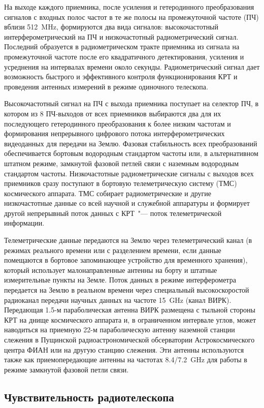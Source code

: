 На выходе каждого приемника, после усиления и гетеродинного преобразования сигналов с входных полос
частот в те же полосы на промежуточной частоте (ПЧ) вблизи \SI{512}{\MHz}, формируются два вида
сигналов: высокочастотный интерферометрический на ПЧ и низкочастотный радиометрический сигнал.
Последний образуется в радиометрическом тракте приемника из сигнала на промежуточной частоте после
его квадратичного детектирования, усиления и усреднения на интервалах времени около секунды.
Радиометрический сигнал дает возможность быстрого и эффективного контроля функционирования КРТ и
проведения антенных измерений в режиме одиночного телескопа.

Высокочастотный сигнал на ПЧ с выхода приемника поступает на селектор ПЧ, в котором из 8 ПЧ-выходов
от всех приемников выбираются два для их последующего гетеродинного преобразования к более низким
частотам и формирования непрерывного цифрового потока интерферометрических видеоданных для передачи
на Землю. Фазовая стабильность всех преобразований обеспечивается бортовым водородным стандартом
частоты или, в альтернативном штатном режиме, замкнутой фазовой петлей связи с наземным водородным
стандартом частоты. Низкочастотные радиометрические сигналы с выходов всех приемников сразу
поступают в бортовую телеметрическую систему (ТМС) космического аппарата. ТМС собирает
радиометрические и другие низкочастотные данные со всей научной и служебной аппаратуры и формирует
другой непрерывный поток данных с КРТ~"--- поток телеметрической информации.

Телеметрические данные передаются на Землю через телеметрический канал (в режимах реального времени
или с разделением времени, если данные помещаются в бортовое запоминающее устройство для временного
хранения), который использует малонаправленные антенны на борту и штатные измерительные пункты на
Земле. Поток данных в режиме интерферометра передается на Землю в реальном времени через специальный
высокоскоростой радиоканал передачи научных данных на частоте \SI{15}{\GHz} (канал ВИРК). Передающая
1.5-м параболическая антенна ВИРК размещена с тыльной стороны КРТ на днище космического аппарата и,
в ограниченном интервале углов, может наводиться на приемную 22-м параболическую антенну наземной
станции слежения в Пущинской радиоастрономической обсерватории Астрокосмического центра ФИАН или на
другую станцию слежения. Эти антенны используются также как приемопередающие антенны на частотах
\num{8.4}/\SI{7.2}{\GHz} для работы в режиме замкнутой фазовой петли связи.

\subsection{Чувствительность радиотелескопа}

